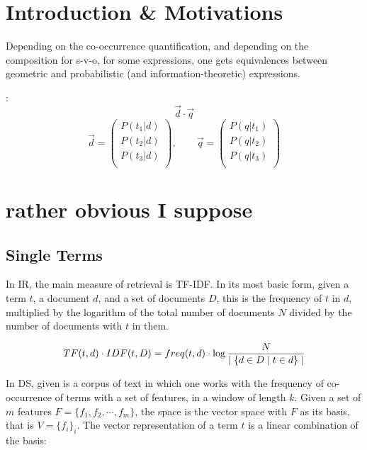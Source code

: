 \section{Introduction \& Motivations}


Depending on the co-occurrence quantification, and depending on the composition for s-v-o, for some expressions, one  gets equivalences between geometric and probabilistic (and information-theoretic) expressions.



\cite{Wong/Yao:95}:
\[
\vec{d} \cdot \vec{q}
\]
\[
\vec{d} =
	\left(
	\begin{matrix}
	P(t_1|d)\\
	P(t_2|d)\\
	P(t_3|d)\\
	\end{matrix}
	\right),
\qquad
\vec{q} =
	\left(
	\begin{matrix}
	P(q|t_1)\\
	P(q|t_2)\\
	P(q|t_3)\\
	\end{matrix}
	\right)
\]

\section{rather obvious I suppose}

\subsection{Single Terms}

In IR, the main measure of retrieval is TF-IDF. In its most basic form, given a term $t$,  a document $d$, and a set of documents $D$, this is the frequency  of   $t$  in $d$, multiplied by  the logarithm of the  total number of documents $N$ divided by the number of documents with $t$ in them. 

\begin{equation}
\label{tf-idf}
TF(t,d) \cdot IDF(t, D) = freq(t, d) \cdot \log{{N} \over {\mid \{d \in D \mid t \in d\}\mid}}
\end{equation}

In DS, given is a corpus of text in which one works with the frequency of co-occurrence of terms with a set of  features, in a window of length $k$. Given a set of $m$ features $F = \{f_1, f_2, \cdots, f_m\}$, the space is the vector space with $F$ as its basis, that is $V = \{f_i\}_i$. The vector representation of a term $t$ is a linear combination of the basis:

